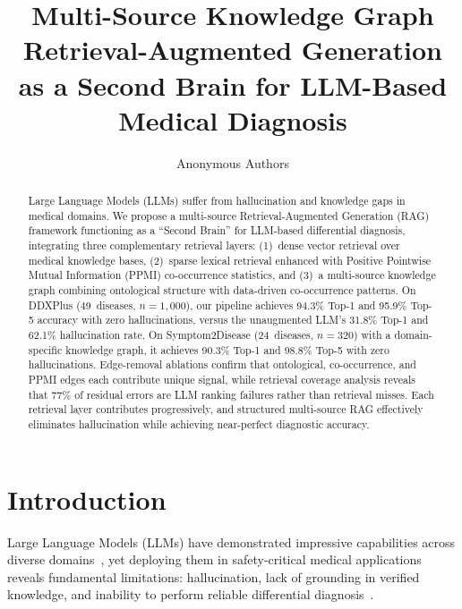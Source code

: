 \documentclass[runningheads]{llncs}
\begin{document}
\title{Multi-Source Knowledge Graph Retrieval-Augmented Generation as a Second Brain for LLM-Based Medical Diagnosis}


\author{Anonymous Authors}

\maketitle

\begin{abstract}
Large Language Models (LLMs) suffer from hallucination and knowledge gaps in medical domains. We propose a multi-source Retrieval-Augmented Generation (RAG) framework functioning as a ``Second Brain'' for LLM-based differential diagnosis, integrating three complementary retrieval layers: (1)~dense vector retrieval over medical knowledge bases, (2)~sparse lexical retrieval enhanced with Positive Pointwise Mutual Information (PPMI) co-occurrence statistics, and (3)~a multi-source knowledge graph combining ontological structure with data-driven co-occurrence patterns. On DDXPlus (49~diseases, $n{=}1{,}000$), our pipeline achieves 94.3\% Top-1 and 95.9\% Top-5 accuracy with zero hallucinations, versus the unaugmented LLM's 31.8\% Top-1 and 62.1\% hallucination rate. On Symptom2Disease (24~diseases, $n{=}320$) with a domain-specific knowledge graph, it achieves 90.3\% Top-1 and 98.8\% Top-5 with zero hallucinations. Edge-removal ablations confirm that ontological, co-occurrence, and PPMI edges each contribute unique signal, while retrieval coverage analysis reveals that 77\% of residual errors are LLM ranking failures rather than retrieval misses. Each retrieval layer contributes progressively, and structured multi-source RAG effectively eliminates hallucination while achieving near-perfect diagnostic accuracy.

\end{abstract}

\section{Introduction}
\label{sec:introduction}

Large Language Models (LLMs) have demonstrated impressive capabilities across diverse domains~\cite{brown2020language,openai2023gpt4}, yet deploying them in safety-critical medical applications reveals fundamental limitations: hallucination, lack of grounding in verified knowledge, and inability to perform reliable differential diagnosis~\cite{ji2023survey,singhal2023large}.
\end{document}
